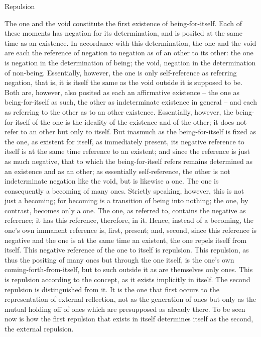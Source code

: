 Repulsion

The one and the void constitute the first existence of being-for-itself. Each
of these moments has negation for its determination, and is posited at the
same time as an existence. In accordance with this determination, the one
and the void are each the reference of negation to negation as of an other
to its other: the one is negation in the determination of being; the void,
negation in the determination of non-being. Essentially, however, the one
is only self-reference as referring negation, that is, it is itself the same as the
void outside it is supposed to be. Both are, however, also posited as each
an affirmative existence – the one as being-for-itself as such, the other as
indeterminate existence in general – and each as referring to the other as
to an other existence. Essentially, however, the being-for-itself of the one
is the ideality of the existence and of the other; it does not refer to an
other but only to itself. But inasmuch as the being-for-itself is fixed as the
one, as existent for itself, as immediately present, its negative reference to
itself is at the same time reference to an existent; and since the reference
is just as much negative, that to which the being-for-itself refers remains
determined as an existence and as an other; as essentially self-reference, the
other is not indeterminate negation like the void, but is likewise a one. The
one is consequently a becoming of many ones.
Strictly speaking, however, this is not just a becoming; for becoming is
a transition of being into nothing; the one, by contrast, becomes only a
one. The one, as referred to, contains the negative as reference; it has this
reference, therefore, in it. Hence, instead of a becoming, the one’s own
immanent reference is, first, present; and, second, since this reference is
negative and the one is at the same time an existent, the one repels itself
from itself. This negative reference of the one to itself is repulsion.
This repulsion, as thus the positing of many ones but through the one
itself, is the one’s own coming-forth-from-itself, but to such outside it as
are themselves only ones. This is repulsion according to the concept, as it
exists implicitly in itself. The second repulsion is distinguished from it. It
is the one that first occurs to the representation of external reflection, not
as the generation of ones but only as the mutual holding off of ones which
are presupposed as already there. To be seen now is how the first repulsion
that exists in itself determines itself as the second, the external repulsion.
